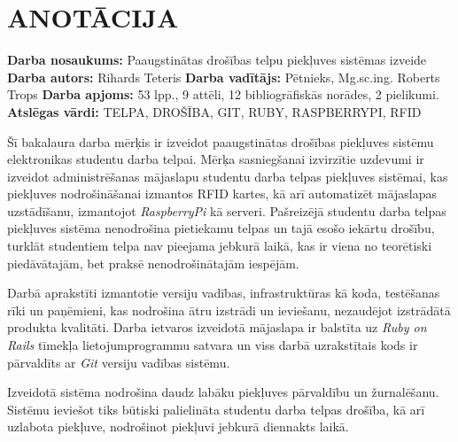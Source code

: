 \chapter*{ANOTĀCIJA}
\noindent \textbf{Darba nosaukums:} Paaugstinātas drošības telpu piekļuves sistēmas izveide\newline
\textbf{Darba autors:} Rihards Teteris\newline
\textbf{Darba vadītājs:} Pētnieks, Mg.sc.ing. Roberts Trops\newline
\textbf{Darba apjoms:} 53 lpp., 9 attēli, 12 bibliogrāfiskās norādes, 2 pielikumi.\newline
\textbf{Atslēgas vārdi:} TELPA, DROŠĪBA, GIT, RUBY, RASPBERRYPI, RFID\newline

Šī bakalaura darba mērķis ir izveidot paaugstinātas drošības piekļuves sistēmu elektronikas studentu darba telpai.
Mērķa sasniegšanai izvirzītie uzdevumi ir izveidot administrēšanas mājaslapu studentu darba telpas piekļuves sistēmai, kas piekļuves nodrošināšanai izmantos RFID kartes, kā arī automatizēt mājaslapas uzstādīšanu, izmantojot \textit{RaspberryPi} kā serveri. Pašreizējā studentu darba telpas piekļuves sistēma nenodrošina pietiekamu telpas un tajā esošo iekārtu drošību, turklāt studentiem telpa nav pieejama jebkurā laikā, kas ir viena no teorētiski piedāvātajām, bet praksē nenodrošinātajām iespējām.

Darbā aprakstīti izmantotie versiju vadības, infrastruktūras kā koda, testēšanas rīki un paņēmieni, kas nodrošina ātru izstrādi un ieviešanu, nezaudējot izstrādātā produkta kvalitāti. Darba ietvaros izveidotā mājaslapa ir balstīta uz \textit{Ruby on Rails} tīmekļa lietojumprogrammu satvara un viss darbā uzrakstītais kods ir pārvaldīts ar \textit{Git} versiju vadības sistēmu.

Izveidotā sistēma nodrošina daudz labāku piekļuves pārvaldību un žurnalēšanu. Sistēmu ieviešot tiks būtiski palielināta studentu darba telpas drošība, kā arī uzlabota piekļuve, nodrošinot piekļuvi jebkurā diennakts laikā.
